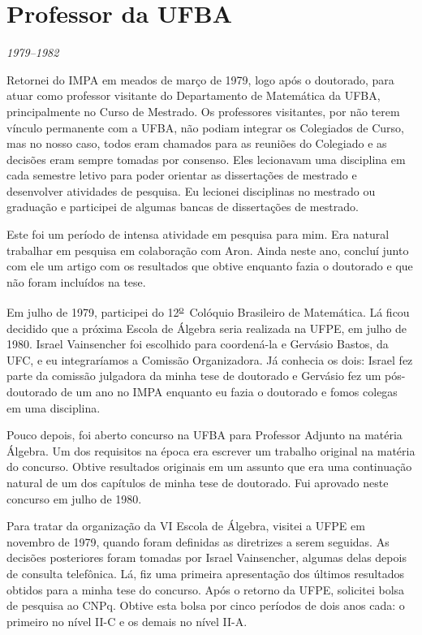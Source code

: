 \documentclass{hipatia}
\newcommand{\superou}{\textsuperscript{\underline{o}}~}
\begin{document}
\section{Professor da UFBA}



\begin{center}\emph{1979--1982}\end{center}



Retornei do IMPA em meados de março de 1979, logo após o
doutorado, para atuar como professor visitante do
Departamento de Matemática da UFBA, principalmente no Curso
de Mestrado. Os professores visitantes, por não terem
vínculo permanente com a UFBA, não podiam integrar os
Colegiados de Curso, mas no nosso caso, todos eram chamados
para as reuniões do Colegiado e as decisões eram sempre
tomadas por consenso. Eles lecionavam uma disciplina em cada
semestre letivo para poder orientar as dissertações de
mestrado e desenvolver atividades de pesquisa. Eu lecionei
disciplinas no mestrado ou graduação e participei de algumas
bancas de dissertações de mestrado.

Este foi um período de intensa atividade em pesquisa para
mim. Era natural trabalhar em pesquisa em colaboração com
Aron. Ainda neste ano, concluí junto com ele um artigo com
os resultados que obtive enquanto fazia o doutorado e que
não foram incluídos na tese.

Em julho de 1979, participei do 12\superou  Colóquio Brasileiro de
Matemática. Lá ficou decidido que a próxima Escola de
Álgebra seria realizada na UFPE, em julho de 1980. %
Israel
Vainsencher foi escolhido para coordená-la e Gervásio
Bastos, da UFC, e eu integraríamos a Comissão Organizadora.
Já conhecia os dois: Israel fez parte da comissão julgadora
da minha tese de doutorado e Gervásio fez um pós-doutorado
de um ano no IMPA enquanto eu fazia o doutorado %
e fomos %
colegas em uma disciplina.

Pouco depois, foi aberto concurso na UFBA para Professor
Adjunto na matéria Álgebra. Um dos requisitos na época era
escrever um trabalho original na matéria do concurso. Obtive
resultados originais em um assunto que era uma continuação
natural de um dos capítulos de minha tese de doutorado. Fui
aprovado neste concurso em julho de 1980.

Para tratar da organização da VI Escola de Álgebra, visitei
a UFPE em novembro de 1979, quando foram definidas as
diretrizes a serem seguidas. As decisões posteriores foram
tomadas por Israel Vainsencher, algumas delas depois de
consulta telefônica. Lá, fiz uma primeira apresentação dos
últimos resultados obtidos para a minha tese do concurso.
Após o retorno da UFPE, solicitei bolsa de pesquisa ao CNPq.
Obtive esta bolsa por cinco períodos de dois anos cada: o
primeiro no nível II-C e os demais no nível II-A.
\end{document}
